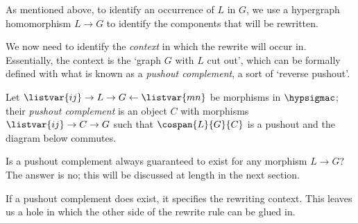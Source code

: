 As mentioned above, to identify an occurrence of \(L\) in \(G\), we use a
hypergraph homomorphism \(L \to G\) to identify the components that will be
rewritten.

\begin{center}
\end{center}

We now need to identify the \emph{context} in which the rewrite will occur in.
Essentially, the context is the `graph \(G\) with \(L\) cut out', which can be
formally defined with what is known as a \emph{pushout complement}, a sort of
`reverse pushout'.

\begin{definition}\label{def:pushout-complement}
    Let \(\listvar{ij} \to L \to G \leftarrow \listvar{mn}\) be morphisms in
    \(\hypsigmac\); their \emph{pushout complement} is an object \(C\)
    with morphisms \(\listvar{ij} \to C \to G\) such that \(\cospan{L}{G}{C}\) is a
    pushout and the diagram below commutes.
    \begin{center}
    \end{center}
\end{definition}

Is a pushout complement always guaranteed to exist for any morphism \(L \to G\)?
The answer is no; this will be discussed at length in the next section.

If a pushout complement does exist, it specifies the rewriting context.
This leaves us a hole in which the other side of the rewrite rule can be glued
in.

